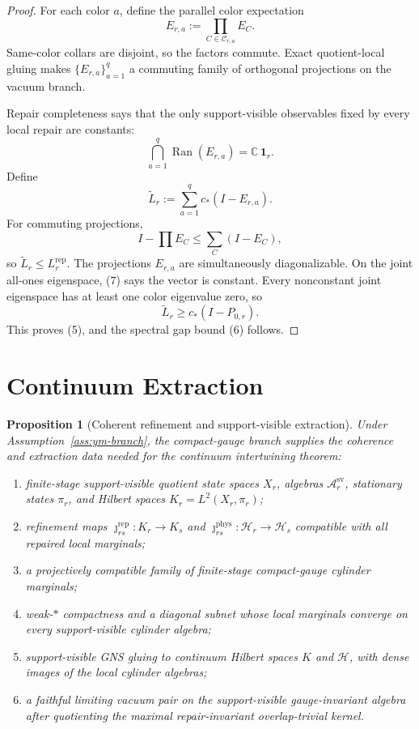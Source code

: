 \documentclass[11pt]{article}
\numberwithin{equation}{section}
\newtheorem{proposition}[theorem]{Proposition}
\theoremstyle{remark}
\newcommand{\Rep}{\mathrm{rep}}
\newcommand{\A}{\mathcal A}
\newcommand{\Hcal}{\mathcal H}
\newcommand{\C}{\mathbb C}
\begin{document}
\begin{proof}
For each color \(a\), define the parallel color expectation
\[
E_{r,a}:=\prod_{C\in\mathcal C_{r,a}}E_C.
\]
Same-color collars are disjoint, so the factors commute. Exact quotient-local gluing makes
\(\{E_{r,a}\}_{a=1}^{q}\) a commuting family of orthogonal projections on the vacuum branch.

Repair completeness says that the only support-visible observables fixed by every local repair
are constants:
\[
\bigcap_{a=1}^{q}\operatorname{Ran}(E_{r,a})=\C\,\mathbf 1_r.
\tag{7}
\]
Define
\[
\widetilde L_r:=\sum_{a=1}^{q} c_*(I-E_{r,a}).
\]
For commuting projections,
\[
I-\prod E_C\le \sum_C(I-E_C),
\]
so \(\widetilde L_r\le L_r^{\Rep}\). The projections \(E_{r,a}\) are simultaneously
diagonalizable. On the joint all-ones eigenspace, (7) says the vector is constant. Every
nonconstant joint eigenspace has at least one color eigenvalue zero, so
\[
\widetilde L_r\ge c_*(I-P_{0,r}).
\]
This proves (5), and the spectral gap bound (6) follows.
\end{proof}

\section{Continuum Extraction}

\begin{proposition}[Coherent refinement and support-visible extraction]
\label{prop:extraction}
Under Assumption~\ref{ass:ym-branch}, the compact-gauge branch supplies the coherence and
extraction data needed for the continuum intertwining theorem:
\begin{enumerate}[(1)]
\item finite-stage support-visible quotient state spaces \(X_r\), algebras
\(\A^{\mathrm{sv}}_r\), stationary states \(\pi_r\), and Hilbert spaces \(K_r=L^2(X_r,\pi_r)\);
\item refinement maps \(\jmath^{\mathrm{rep}}_{rs}:K_r\to K_s\) and
\(\jmath^{\mathrm{phys}}_{rs}:\Hcal_r\to\Hcal_s\) compatible with all repaired local marginals;
\item a projectively compatible family of finite-stage compact-gauge cylinder marginals;
\item weak-\(*\) compactness and a diagonal subnet whose local marginals converge on every
support-visible cylinder algebra;
\item support-visible GNS gluing to continuum Hilbert spaces \(K\) and \(\Hcal\), with dense
images of the local cylinder algebras;
\item a faithful limiting vacuum pair on the support-visible gauge-invariant algebra after
quotienting the maximal repair-invariant overlap-trivial kernel.
\end{enumerate}
\end{proposition}
\end{document}
